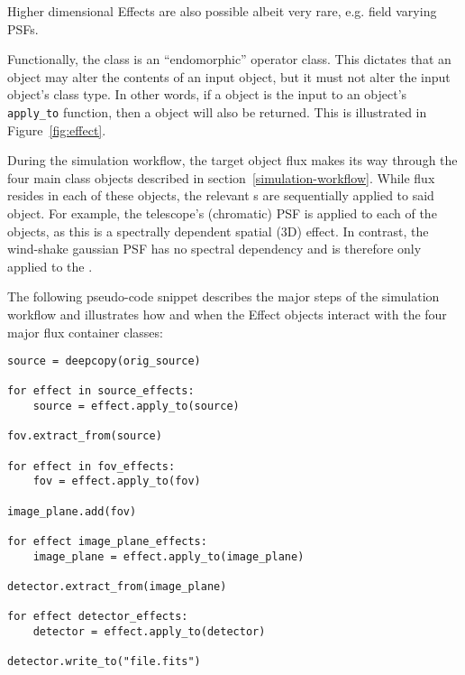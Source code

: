 Higher dimensional Effects are also possible albeit very rare, e.g. field varying PSFs.

Functionally, the \Effect{} class is an ``endomorphic'' operator class.
This dictates that an \Effect{} object may alter the contents of an input object, but it must not alter the input object's class type.
In other words, if a \Source{} object is the input to an \Effect{} object's \lstinline{apply_to} function, then a \Source{} object will also be returned.
This is illustrated in Figure~\ref{fig:effect}.

During the simulation workflow, the target object flux makes its way through the four main class objects described in section~\ref{simulation-workflow}.
While flux resides in each of these objects, the relevant \Effect{}s are sequentially applied to said object.
For example, the telescope's (chromatic) PSF is applied to each of the \FieldOfView{} objects, as this is a spectrally dependent spatial (3D) effect.
In contrast, the wind-shake gaussian PSF has no spectral dependency and is therefore only applied to the \ImagePlane{}.

The following pseudo-code snippet describes the major steps of the simulation workflow and illustrates how and when the Effect objects interact with the four major flux container classes:

\begin{lstlisting}[frame=single]
source = deepcopy(orig_source)

for effect in source_effects:
    source = effect.apply_to(source)

fov.extract_from(source)

for effect in fov_effects:
    fov = effect.apply_to(fov)

image_plane.add(fov)

for effect image_plane_effects:
    image_plane = effect.apply_to(image_plane)

detector.extract_from(image_plane)

for effect detector_effects:
    detector = effect.apply_to(detector)

detector.write_to("file.fits")
\end{lstlisting}

